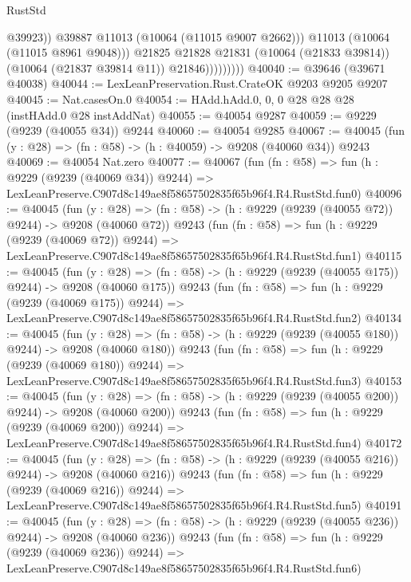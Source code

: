 \begin{lexlean}{RustStd}
\begin{coremodule}
                              @39923))
                          @39887
                          @11013
                          (@10064 (@11015 @9007 @2662)))
                        @11013
                        (@10064 (@11015 @8961 @9048)))
                      @21825
                      @21828
                      @21831
                      (@10064 (@21833 @39814))
                      (@10064 (@21837 @39814 @11))
                      @21846)))))))))
@40040 := @39646 (@39671 @40038)
@40044 := LexLeanPreservation.Rust.CrateOK @9203 @9205 @9207
@40045 := Nat.casesOn.{0}
@40054 := HAdd.hAdd.{0, 0, 0} @28 @28 @28 (instHAdd.{0} @28 instAddNat)
@40055 := @40054 @9287
@40059 := @9229 (@9239 (@40055 @34)) @9244
@40060 := @40054 @9285
@40067 := @40045 (fun (y : @28) => (fn : @58) -> (h : @40059) -> @9208 (@40060 @34)) @9243
@40069 := @40054 Nat.zero
@40077 := @40067
    (fun (fn : @58) =>
    fun (h : @9229 (@9239 (@40069 @34)) @9244) =>
    LexLeanPreserve.C907d8c149ae8f58657502835f65b96f4.R4.RustStd.fun0)
@40096 := @40045
    (fun (y : @28) => (fn : @58) -> (h : @9229 (@9239 (@40055 @72)) @9244) -> @9208 (@40060 @72))
    @9243
    (fun (fn : @58) =>
    fun (h : @9229 (@9239 (@40069 @72)) @9244) =>
    LexLeanPreserve.C907d8c149ae8f58657502835f65b96f4.R4.RustStd.fun1)
@40115 := @40045
    (fun (y : @28) => (fn : @58) -> (h : @9229 (@9239 (@40055 @175)) @9244) -> @9208 (@40060 @175))
    @9243
    (fun (fn : @58) =>
    fun (h : @9229 (@9239 (@40069 @175)) @9244) =>
    LexLeanPreserve.C907d8c149ae8f58657502835f65b96f4.R4.RustStd.fun2)
@40134 := @40045
    (fun (y : @28) => (fn : @58) -> (h : @9229 (@9239 (@40055 @180)) @9244) -> @9208 (@40060 @180))
    @9243
    (fun (fn : @58) =>
    fun (h : @9229 (@9239 (@40069 @180)) @9244) =>
    LexLeanPreserve.C907d8c149ae8f58657502835f65b96f4.R4.RustStd.fun3)
@40153 := @40045
    (fun (y : @28) => (fn : @58) -> (h : @9229 (@9239 (@40055 @200)) @9244) -> @9208 (@40060 @200))
    @9243
    (fun (fn : @58) =>
    fun (h : @9229 (@9239 (@40069 @200)) @9244) =>
    LexLeanPreserve.C907d8c149ae8f58657502835f65b96f4.R4.RustStd.fun4)
@40172 := @40045
    (fun (y : @28) => (fn : @58) -> (h : @9229 (@9239 (@40055 @216)) @9244) -> @9208 (@40060 @216))
    @9243
    (fun (fn : @58) =>
    fun (h : @9229 (@9239 (@40069 @216)) @9244) =>
    LexLeanPreserve.C907d8c149ae8f58657502835f65b96f4.R4.RustStd.fun5)
@40191 := @40045
    (fun (y : @28) => (fn : @58) -> (h : @9229 (@9239 (@40055 @236)) @9244) -> @9208 (@40060 @236))
    @9243
    (fun (fn : @58) =>
    fun (h : @9229 (@9239 (@40069 @236)) @9244) =>
    LexLeanPreserve.C907d8c149ae8f58657502835f65b96f4.R4.RustStd.fun6)

\end{coremodule}
\end{lexlean}

